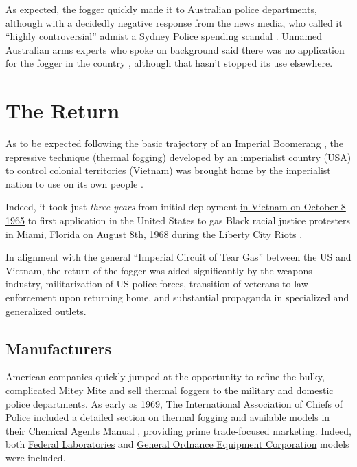 \documentclass[
  11pt,
]{krantz}
\begin{document}
\protect\hyperlink{TheReturn}{As expected}, the fogger quickly made it to Australian police departments, although with a decidedly negative response from the news media, who called it ``highly controversial'' admist a Sydney Police spending scandal \citep{Allen1972}.
Unnamed Australian arms experts who spoke on background said there was no application for the fogger in the country \citep{Allen1972}, although that hasn't stopped its use elsewhere.

\hypertarget{TheReturn}{%
\chapter*{The Return}\label{TheReturn}}


As to be expected following the basic trajectory of an Imperial Boomerang \citep{Cesaire1950, Arendt1951, Foucault1976}, the repressive technique (thermal fogging) developed by an imperialist country (USA) to control colonial territories (Vietnam) was brought home by the imperialist nation to use on its own people \citep{Graham2013}.

Indeed, it took just \emph{three years} from initial deployment \protect\hyperlink{FirstUse}{in Vietnam on October 8 1965} to first application in the United States to gas Black racial justice protesters in \protect\hyperlink{MiamiFL1968_08_08}{Miami, Florida on August 8th, 1968} during the Liberty City Riots \citep{Tschenschlok1995, Lorentzen2018}.

In alignment with the general ``Imperial Circuit of Tear Gas'' \citep{Schrader2019} between the US and Vietnam, the return of the fogger was aided significantly by the weapons industry, militarization of US police forces, transition of veterans to law enforcement upon returning home, and substantial propaganda in specialized and generalized outlets.

\hypertarget{manufacturers}{%
\section*{Manufacturers}\label{manufacturers}}


American companies quickly jumped at the opportunity to refine the bulky, complicated Mitey Mite and sell thermal foggers to the military and domestic police departments.
As early as 1969, The International Association of Chiefs of Police included a detailed section on thermal fogging and available models in their Chemical Agents Manual \citep{Crockett1969}, providing prime trade-focused marketing.
Indeed, both \protect\hyperlink{FederalLaboratories}{Federal Laboratories} and \protect\hyperlink{GOEC}{General Ordnance Equipment Corporation} models were included.
\end{document}

